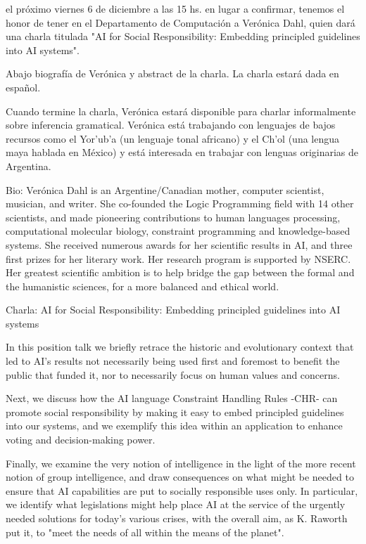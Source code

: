 \documentclass[a4paper,11pt]{article}
\begin{document}
el próximo viernes 6 de diciembre a las 15 hs. en lugar a confirmar, tenemos el honor de tener en el Departamento de Computación a Verónica Dahl, quien dará una charla titulada "AI for Social Responsibility: Embedding principled guidelines into AI systems".

Abajo biografía de Verónica y abstract de la charla. La charla estará dada en español.

Cuando termine la charla, Verónica estará disponible para charlar informalmente sobre inferencia gramatical. Verónica está trabajando con lenguajes de bajos recursos como el Yor'ub'a (un lenguaje tonal africano) y el Ch’ol (una lengua maya hablada en México) y está interesada en trabajar con lenguas originarias de Argentina.


Bio: Verónica Dahl is an Argentine/Canadian mother, computer scientist, musician, and writer. She co-founded the Logic Programming field with 14 other scientists, and made pioneering contributions to human languages processing, computational molecular biology, constraint programming and knowledge-based systems. She received numerous awards for her scientific results in AI, and three first prizes for her literary work. Her research program is supported by NSERC. Her greatest scientific ambition is to help bridge the gap between the formal and the humanistic sciences, for a more balanced and ethical world.

Charla: AI for Social Responsibility: Embedding principled guidelines into AI systems

In this position talk we briefly retrace the historic and evolutionary context that led to AI's results not necessarily being used first and foremost to benefit the public that funded it, nor to necessarily focus on human values and concerns.

Next, we discuss how the AI language Constraint Handling Rules -CHR- can promote social responsibility by making it easy to embed principled guidelines into our systems, and we exemplify this idea within an application to enhance voting and decision-making power.

Finally, we examine the very notion of intelligence in the light of the more recent notion of group intelligence, and draw consequences on what might be needed to ensure that AI capabilities are put to socially responsible uses only. In particular, we identify what legislations might help place AI at the service of the urgently needed solutions for today's various crises, with the overall aim, as K. Raworth put it, to "meet the needs of all within the means of the planet".
\end{document}
